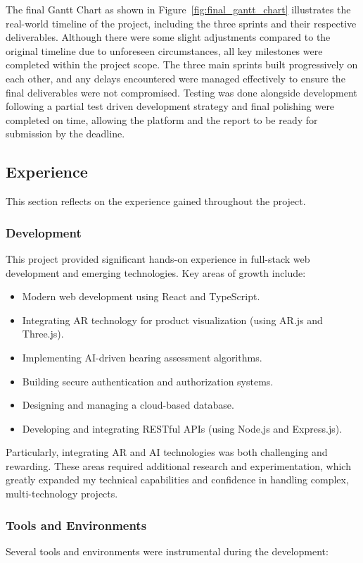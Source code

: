 \documentclass{article}
\begin{document}
The final Gantt Chart as shown in Figure~\ref{fig:final_gantt_chart} illustrates the real-world timeline of the project, including the three sprints and their respective deliverables. Although there were some slight adjustments compared to the original timeline due to unforeseen circumstances, all key milestones were completed within the project scope.
The three main sprints built progressively on each other, and any delays encountered were managed effectively to ensure the final deliverables were not compromised. Testing was done alongside development following a partial test driven development strategy and final polishing were completed on time, allowing the platform and the report to be ready for submission by the deadline.

\subsection{Experience}
This section reflects on the experience gained throughout the project.
\subsubsection{Development}
This project provided significant hands-on experience in full-stack web development and emerging technologies. Key areas of growth include:

\begin{itemize}
    \item Modern web development using React and TypeScript.
    \item Integrating AR technology for product visualization (using AR.js and Three.js).
    \item Implementing AI-driven hearing assessment algorithms.
    \item Building secure authentication and authorization systems.
    \item Designing and managing a cloud-based database.
    \item Developing and integrating RESTful APIs (using Node.js and Express.js).
\end{itemize}

Particularly, integrating AR and AI technologies was both challenging and rewarding. These areas required additional research and experimentation, which greatly expanded my technical capabilities and confidence in handling complex, multi-technology projects.

\subsubsection{Tools and Environments}
Several tools and environments were instrumental during the development:
\end{document}
